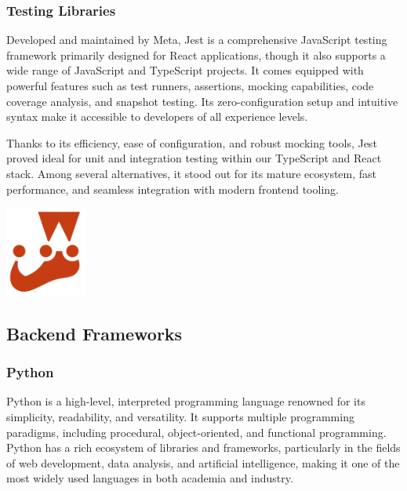 \subsubsection{Testing Libraries}
Developed and maintained by Meta, Jest is a comprehensive JavaScript testing framework primarily designed for React applications, though it also supports a wide range of JavaScript and TypeScript projects. It comes equipped with powerful features such as test runners, assertions, mocking capabilities, code coverage analysis, and snapshot testing. Its zero-configuration setup and intuitive syntax make it accessible to developers of all experience levels.\mynewline

Thanks to its efficiency, ease of configuration, and robust mocking tools, Jest proved ideal for unit and integration testing within our TypeScript and React stack. Among several alternatives, it stood out for its mature ecosystem, fast performance, and seamless integration with modern frontend tooling.

\begin{center}
    \centering
    \includegraphics[width=0.2\textwidth]{Images/Jest Logo.png}
     \cite{jest_logo}
    \label{fig:jest_logo}
\end{center}

\subsection{Backend Frameworks}

\subsubsection{Python}
Python is a high-level, interpreted programming language renowned for its simplicity, readability, and versatility. It supports multiple programming paradigms, including procedural, object-oriented, and functional programming. Python has a rich ecosystem of libraries and frameworks, particularly in the fields of web development, data analysis, and artificial intelligence, making it one of the most widely used languages in both academia and industry.\mynewline

